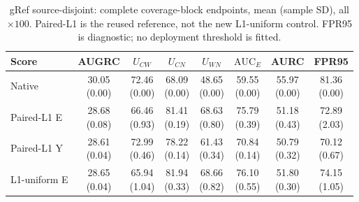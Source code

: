 \begin{table}[t]
\centering\footnotesize
\setlength{\tabcolsep}{3pt}
\renewcommand{\arraystretch}{1.15}
\caption{gRef source-disjoint: complete coverage-block endpoints, mean (sample SD), all $\times100$. Paired-L1 is the reused reference, not the new L1-uniform control. FPR95 is diagnostic; no deployment threshold is fitted.}\label{tab:coverage_endpoints_gref_source_disjoint}
\begin{tabular}{@{}lccccccc@{}}\toprule
Score & AUGRC & $U_{CW}$ & $U_{CN}$ & $U_{WN}$ & $\mathrm{AUC}_E$ & AURC & FPR95\\\midrule
Native & \shortstack{30.05\\{\scriptsize (0.00)}} & \shortstack{72.46\\{\scriptsize (0.00)}} & \shortstack{68.09\\{\scriptsize (0.00)}} & \shortstack{48.65\\{\scriptsize (0.00)}} & \shortstack{59.55\\{\scriptsize (0.00)}} & \shortstack{55.97\\{\scriptsize (0.00)}} & \shortstack{81.36\\{\scriptsize (0.00)}}\\
Paired-L1 E & \shortstack{28.68\\{\scriptsize (0.08)}} & \shortstack{66.46\\{\scriptsize (0.93)}} & \shortstack{81.41\\{\scriptsize (0.19)}} & \shortstack{68.63\\{\scriptsize (0.80)}} & \shortstack{75.79\\{\scriptsize (0.39)}} & \shortstack{51.18\\{\scriptsize (0.43)}} & \shortstack{72.89\\{\scriptsize (2.03)}}\\
Paired-L1 Y & \shortstack{28.61\\{\scriptsize (0.04)}} & \shortstack{72.99\\{\scriptsize (0.46)}} & \shortstack{78.22\\{\scriptsize (0.14)}} & \shortstack{61.43\\{\scriptsize (0.34)}} & \shortstack{70.84\\{\scriptsize (0.14)}} & \shortstack{50.79\\{\scriptsize (0.32)}} & \shortstack{70.12\\{\scriptsize (0.67)}}\\
L1-uniform E & \shortstack{28.65\\{\scriptsize (0.04)}} & \shortstack{65.94\\{\scriptsize (1.04)}} & \shortstack{81.94\\{\scriptsize (0.33)}} & \shortstack{68.66\\{\scriptsize (0.82)}} & \shortstack{76.10\\{\scriptsize (0.55)}} & \shortstack{51.80\\{\scriptsize (0.30)}} & \shortstack{74.15\\{\scriptsize (1.05)}}\\

\end{tabular}
\end{table}
